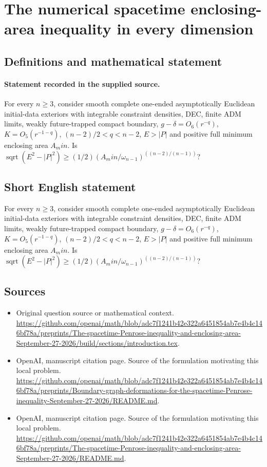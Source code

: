 \documentclass[11pt]{article}
\begin{document}
\section*{The numerical spacetime enclosing-area inequality in every dimension}\label{statement}
\subsection{Definitions and mathematical statement}
\paragraph{Statement recorded in the supplied source.}
For every $n\geq 3$, consider smooth complete one-ended asymptotically Euclidean initial-data exteriors with integrable constraint densities, DEC, finite ADM limits, weakly future-trapped compact boundary, $g-\delta =O_6(r^{-q})$, $K=O_5(r^{-1-q})$, $(n-2)/2<q<n-2$, $E>|P|$ and positive full minimum enclosing area $A_min$. Is $\operatorname{sqrt}(E^2-|P|^2)\geq (1/2)(A_min/\omega _{n-1})^((n-2)/(n-1))$?
\subsection{Short English statement}
For every $n\geq 3$, consider smooth complete one-ended asymptotically Euclidean initial-data exteriors with integrable constraint densities, DEC, finite ADM limits, weakly future-trapped compact boundary, $g-\delta =O_6(r^{-q})$, $K=O_5(r^{-1-q})$, $(n-2)/2<q<n-2$, $E>|P|$ and positive full minimum enclosing area $A_min$. Is $\operatorname{sqrt}(E^2-|P|^2)\geq (1/2)(A_min/\omega _{n-1})^((n-2)/(n-1))$?
\subsection{Sources}
\begin{itemize}
\item[S1] Original question source or mathematical context.
\url{https://github.com/openai/math/blob/adc7f1241b42e322a6451854ab7e4b4c146bf78a/preprints/The-spacetime-Penrose-inequality-and-enclosing-area-September-27-2026/build/sections/introduction.tex}.
\item[S2] OpenAI, manuscript citation page. Source of the formulation motivating this local problem.
\url{https://github.com/openai/math/blob/adc7f1241b42e322a6451854ab7e4b4c146bf78a/preprints/Boundary-graph-deformations-for-the-spacetime-Penrose-inequality-September-27-2026/README.md}.
\item[S3] OpenAI, manuscript citation page. Source of the formulation motivating this local problem.
\url{https://github.com/openai/math/blob/adc7f1241b42e322a6451854ab7e4b4c146bf78a/preprints/The-spacetime-Penrose-inequality-and-enclosing-area-September-27-2026/README.md}.
\end{itemize}
\end{document}
